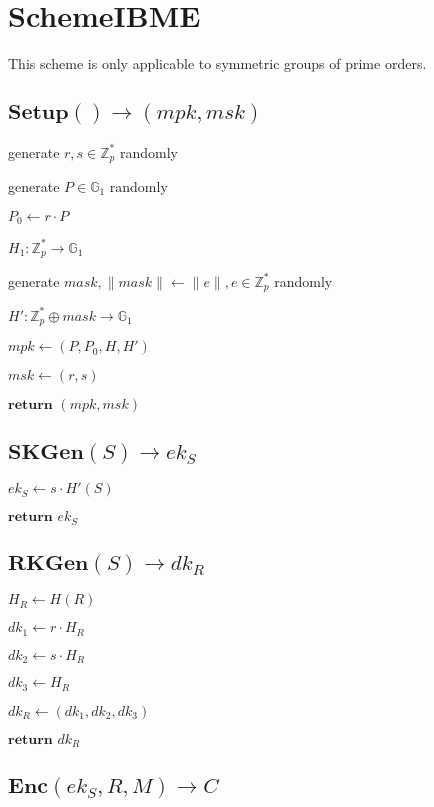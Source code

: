 \documentclass[a4paper]{article}
\begin{document}
\section{SchemeIBME}

This scheme is only applicable to symmetric groups of prime orders. 

\subsection{$\textbf{Setup}() \rightarrow (\textit{mpk}, \textit{msk})$}

generate $r, s \in \mathbb{Z}_p^*$ randomly

generate $P \in \mathbb{G}_1$ randomly

$P_0 \gets r \cdot P$

$H_1: \mathbb{Z}_p^* \rightarrow \mathbb{G}_1$

generate $\textit{mask}, \|\textit{mask}\| \gets \|e\|, e \in \mathbb{Z}_p^*$ randomly

$H': \mathbb{Z}_p^* \oplus \textit{mask} \rightarrow \mathbb{G}_1$

$\textit{mpk} \gets (P, P_0, H, H')$

$\textit{msk} \gets (r, s)$

$\textbf{return }(\textit{mpk}, \textit{msk})$

\subsection{$\textbf{SKGen}(S) \rightarrow \textit{ek}_S$}

$\textit{ek}_S \gets s \cdot H'(S)$

$\textbf{return }\textit{ek}_S$

\subsection{$\textbf{RKGen}(S) \rightarrow \textit{dk}_R$}

$H_R \gets H(R)$

$\textit{dk}_1 \gets r \cdot H_R$

$\textit{dk}_2 \gets s \cdot H_R$

$\textit{dk}_3 \gets H_R$

$\textit{dk}_R \gets (\textit{dk}_1, \textit{dk}_2, \textit{dk}_3)$

$\textbf{return }\textit{dk}_R$

\subsection{$\textbf{Enc}(\textit{ek}_S, R, M) \rightarrow C$}
\end{document}
